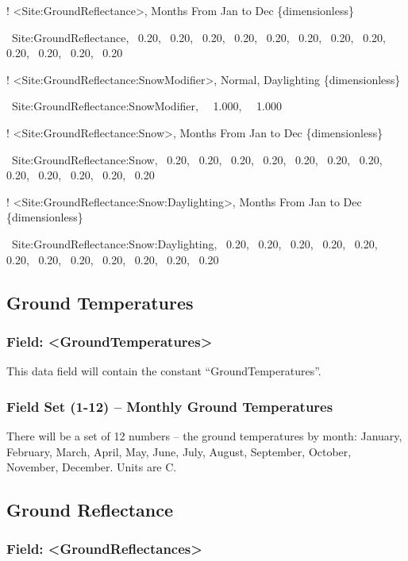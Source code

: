 ! \textless{}Site:GroundReflectance\textgreater{}, Months From Jan to Dec \{dimensionless\}

~Site:GroundReflectance,~ 0.20,~ 0.20,~ 0.20,~ 0.20,~ 0.20,~ 0.20,~ 0.20,~ 0.20,~ 0.20,~ 0.20,~ 0.20,~ 0.20

! \textless{}Site:GroundReflectance:SnowModifier\textgreater{}, Normal, Daylighting \{dimensionless\}

~Site:GroundReflectance:SnowModifier,~~ 1.000,~~ 1.000

! \textless{}Site:GroundReflectance:Snow\textgreater{}, Months From Jan to Dec \{dimensionless\}

~Site:GroundReflectance:Snow,~ 0.20,~ 0.20,~ 0.20,~ 0.20,~ 0.20,~ 0.20,~ 0.20,~ 0.20,~ 0.20,~ 0.20,~ 0.20,~ 0.20

! \textless{}Site:GroundReflectance:Snow:Daylighting\textgreater{}, Months From Jan to Dec \{dimensionless\}

~Site:GroundReflectance:Snow:Daylighting,~ 0.20,~ 0.20,~ 0.20,~ 0.20,~ 0.20,~ 0.20,~ 0.20,~ 0.20,~ 0.20,~ 0.20,~ 0.20,~ 0.20

\subsection{Ground Temperatures}\label{ground-temperatures}

\subsubsection{Field: \textless{}GroundTemperatures\textgreater{}}\label{field-groundtemperatures}

This data field will contain the constant ``GroundTemperatures''.

\subsubsection{Field Set (1-12) -- Monthly Ground Temperatures}\label{field-set-1-12-monthly-ground-temperatures}

There will be a set of 12 numbers -- the ground temperatures by month: January, February, March, April, May, June, July, August, September, October, November, December. Units are C.

\subsection{Ground Reflectance}\label{ground-reflectance}

\subsubsection{Field: \textless{}GroundReflectances\textgreater{}}\label{field-groundreflectances}

